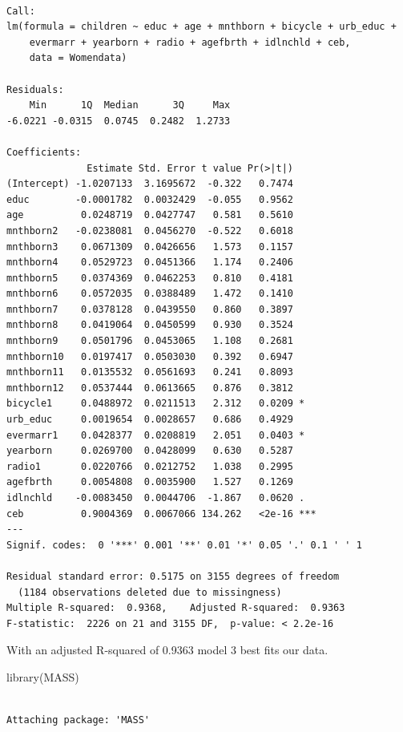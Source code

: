 \documentclass[
  letterpaper,
  DIV=11,
  numbers=noendperiod]{scrartcl}
\newenvironment{Shaded}{\begin{snugshade}}{\end{snugshade}}
\newcommand{\FunctionTok}[1]{\textcolor[rgb]{0.28,0.35,0.67}{#1}}
\newcommand{\NormalTok}[1]{\textcolor[rgb]{0.00,0.23,0.31}{#1}}
\begin{document}
\begin{verbatim}

Call:
lm(formula = children ~ educ + age + mnthborn + bicycle + urb_educ + 
    evermarr + yearborn + radio + agefbrth + idlnchld + ceb, 
    data = Womendata)

Residuals:
    Min      1Q  Median      3Q     Max 
-6.0221 -0.0315  0.0745  0.2482  1.2733 

Coefficients:
              Estimate Std. Error t value Pr(>|t|)    
(Intercept) -1.0207133  3.1695672  -0.322   0.7474    
educ        -0.0001782  0.0032429  -0.055   0.9562    
age          0.0248719  0.0427747   0.581   0.5610    
mnthborn2   -0.0238081  0.0456270  -0.522   0.6018    
mnthborn3    0.0671309  0.0426656   1.573   0.1157    
mnthborn4    0.0529723  0.0451366   1.174   0.2406    
mnthborn5    0.0374369  0.0462253   0.810   0.4181    
mnthborn6    0.0572035  0.0388489   1.472   0.1410    
mnthborn7    0.0378128  0.0439550   0.860   0.3897    
mnthborn8    0.0419064  0.0450599   0.930   0.3524    
mnthborn9    0.0501796  0.0453065   1.108   0.2681    
mnthborn10   0.0197417  0.0503030   0.392   0.6947    
mnthborn11   0.0135532  0.0561693   0.241   0.8093    
mnthborn12   0.0537444  0.0613665   0.876   0.3812    
bicycle1     0.0488972  0.0211513   2.312   0.0209 *  
urb_educ     0.0019654  0.0028657   0.686   0.4929    
evermarr1    0.0428377  0.0208819   2.051   0.0403 *  
yearborn     0.0269700  0.0428099   0.630   0.5287    
radio1       0.0220766  0.0212752   1.038   0.2995    
agefbrth     0.0054808  0.0035900   1.527   0.1269    
idlnchld    -0.0083450  0.0044706  -1.867   0.0620 .  
ceb          0.9004369  0.0067066 134.262   <2e-16 ***
---
Signif. codes:  0 '***' 0.001 '**' 0.01 '*' 0.05 '.' 0.1 ' ' 1

Residual standard error: 0.5175 on 3155 degrees of freedom
  (1184 observations deleted due to missingness)
Multiple R-squared:  0.9368,    Adjusted R-squared:  0.9363 
F-statistic:  2226 on 21 and 3155 DF,  p-value: < 2.2e-16
\end{verbatim}

With an adjusted R-squared of 0.9363 model 3 best fits our data.

\begin{Shaded}
\begin{Highlighting}[]
\FunctionTok{library}\NormalTok{(MASS)}
\end{Highlighting}
\end{Shaded}

\begin{verbatim}

Attaching package: 'MASS'
\end{verbatim}
\end{document}
